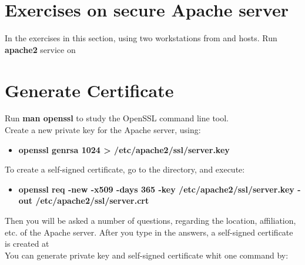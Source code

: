 \documentclass{../UTNetLab}
\begin{document}
\section*{Exercises on secure Apache server}
	In the exercises in this section, using two workstations from  and  hosts. Run \textbf{apache2} service on 

\section{Generate Certificate}
	Run \textbf{man openssl} to study the OpenSSL command line tool.\\
	Create a new private key for the Apache server, using:
	\begin{itemize}
		\item \textbf{openssl genrsa 1024 > /etc/apache2/ssl/server.key}
	\end{itemize}
	To create a self-signed certificate, go to the  directory, and execute:
	\begin{itemize}
		\item \textbf{openssl req -new -x509 -days 365 -key /etc/apache2/ssl/server.key -out /etc/apache2/ssl/server.crt}
	\end{itemize}
	Then you will be asked a number of questions, regarding the location, affiliation, etc. of the Apache server. After you type in the answers, a self-signed certificate is created at \\
	You can generate private key and self-signed certificate whit one command by:
\end{document}
